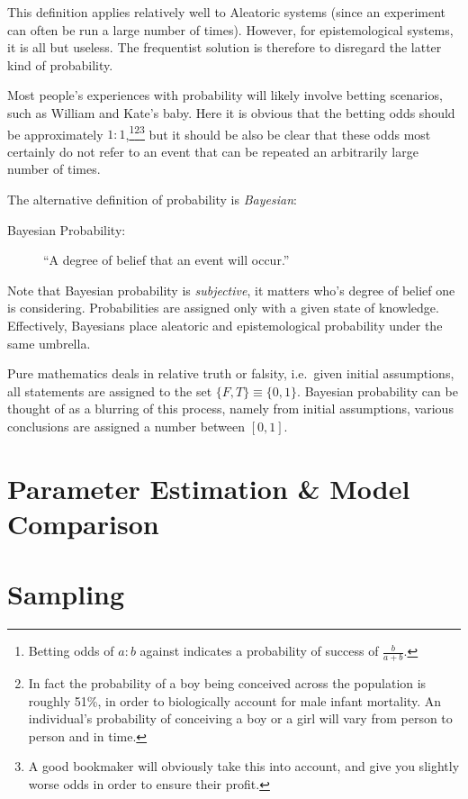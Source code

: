 This definition applies relatively well to Aleatoric systems (since an experiment can often be run a large number of times). However, for epistemological systems, it is all but useless. The frequentist solution is therefore to disregard the latter kind of probability.

Most people's experiences with probability will likely involve betting scenarios, such as William and Kate's baby. Here it is obvious that the betting odds should be approximately $1:1$,\footnote{Betting odds of $a:b$ against indicates a probability of success of $\frac{b}{a+b}$.}\footnote{In fact the probability of a boy being conceived across the population is roughly 51\%, in order to biologically account for male infant mortality. An individual's probability of conceiving a boy or a girl will vary from person to person and in time.}\footnote{A good bookmaker will obviously take this into account, and give you slightly worse odds in order to ensure their profit.} but it should be also be clear that these odds most certainly do not refer to an event that can be repeated an arbitrarily large number of times.

The alternative definition of probability is {\em Bayesian\/}:
\begin{description}
  \item[Bayesian Probability:] ``A degree of belief that an event will occur.'' 
\end{description}
Note that Bayesian probability is {\em subjective}, it matters who's degree of belief one is considering. Probabilities are assigned only with a given state of knowledge. Effectively, Bayesians place aleatoric and epistemological probability under the same umbrella. 

Pure mathematics deals in relative truth or falsity, i.e.\ given initial assumptions, all statements are assigned to the set $\{F,T\}\equiv\{0,1\}$. Bayesian probability can be thought of as a blurring of this process, namely from initial assumptions, various conclusions are assigned a number between $[0,1]$.

\section{Parameter Estimation \& Model Comparison}
\label{sec:bay:model_comp}


\section{Sampling}
\label{sec:bay:samp}


